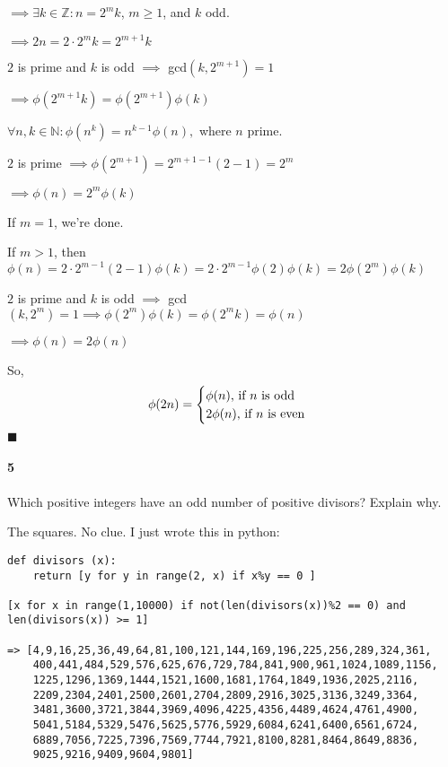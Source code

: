 \documentclass{article}
\begin{document}
$\implies \exists k\in \mathbb{Z}: n = 2^mk$, $m\geq 1$, and $k$ odd.

$\implies 2n = 2\cdot 2^mk = 2^{m+1}k$

$2$ is prime and $k$ is odd $\implies$ gcd$(k, 2^{m+1}) =1$

$\implies \phi(2^{m+1}k) = \phi(2^{m+1})\phi(k)$

$\forall n,k \in \mathbb{N}: \phi(n^k)=
n^{k−1}\phi(n),$ where $n$ prime.

$2$ is prime $\implies \phi(2^{m+1}) = 2^{m + 1-1}(2-1) = 2^m$

$\implies \phi(n) = 2^m\phi(k)$

If $m = 1$, we're done.

If $m > 1$, then $\phi(n) = 2\cdot 2^{m-1}(2-1)\phi(k) = 2
\cdot 2^{m-1}\phi(2)\phi(k) = 2\phi(2^m)\phi(k)$

$2$ is prime and $k$ is odd $\implies$ gcd$(k,2^m) = 1 \implies \phi(2^m)\phi(k) = \phi(2^mk) = \phi(n)$

$\implies \phi(n) = 2\phi(n)$

So,
\[\phi(2n) = \begin{cases}\phi(n)$, if $n$ is odd$\\
                          2\phi(n)$, if $n$ is even$\\\end{cases}\]
\vspace{0.618 em}
$\blacksquare$


\paragraph{5} Which positive integers have an odd number of positive
divisors? Explain why.

The squares. No clue. I just wrote this in python:

\begin{verbatim}
def divisors (x):
    return [y for y in range(2, x) if x%y == 0 ]

[x for x in range(1,10000) if not(len(divisors(x))%2 == 0) and
len(divisors(x)) >= 1]

=> [4,9,16,25,36,49,64,81,100,121,144,169,196,225,256,289,324,361,
    400,441,484,529,576,625,676,729,784,841,900,961,1024,1089,1156,
    1225,1296,1369,1444,1521,1600,1681,1764,1849,1936,2025,2116,
    2209,2304,2401,2500,2601,2704,2809,2916,3025,3136,3249,3364,
    3481,3600,3721,3844,3969,4096,4225,4356,4489,4624,4761,4900,
    5041,5184,5329,5476,5625,5776,5929,6084,6241,6400,6561,6724,
    6889,7056,7225,7396,7569,7744,7921,8100,8281,8464,8649,8836,
    9025,9216,9409,9604,9801]

\end{verbatim}
\end{document}
